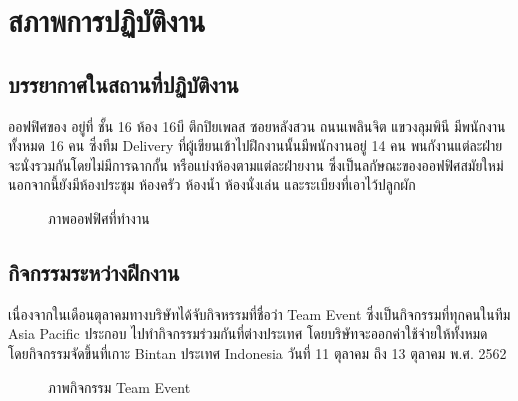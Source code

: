 \chapter{สภาพการปฏิบัติงาน}

\section{บรรยากาศในสถานที่ปฏิบัติงาน}

ออฟฟิศของ \Company อยู่ที่ ชั้น 16 ห้อง 16บี ตึกปิยเพลส ซอยหลังสวน ถนนเพลินจิต แขวงลุมพินี มีพนักงานทั้งหมด 16 คน ซึ่งทีม Delivery ที่ผู้เขียนเข้าไปฝึกงานนั้นมีพนักงานอยู่ 14 คน พนกังานแต่ละฝ่ายจะนั่งรวมกันโดยไม่มีการฉากกั้น หรือแบ่งห้องตามแต่ละฝ่ายงาน ซึ่งเป็นลกัษณะของออฟฟิศสมัยใหม่นอกจากนี้ยังมีห้องประชุม ห้องครัว ห้องน้ำ ห้องนั่งเล่น และระเบียงที่เอาไว้ปลูกผัก

\begin{figure}[!h]
    \centering
    \caption{ภาพออฟฟิศที่ทำงาน}
    \label{Fig:office}
\end{figure}

\section{กิจกรรมระหว่างฝึกงาน}

เนื่องจากในเดือนตุลาคมทางบริษัทได้จับกิจหรรมที่ชื่อว่า Team Event ซึ่งเป็นกิจกรรมที่ทุกคนในทีม Asia Pacific ประกอบ ไปทำกิจกรรมร่วมกันที่ต่างประเทศ โดยบริษัทจะออกค่าใช้จ่ายให้ทั้งหมด โดยกิจกรรมจัดขึ้นที่เกาะ Bintan ประเทศ Indonesia วันที่ 11 ตุลาคม ถึง 13 ตุลาคม พ.ศ. 2562

\begin{figure}[!h]
	\centering
	\caption{ภาพกิจกรรม Team Event}
	\label{Fig:teamevent}
\end{figure}

